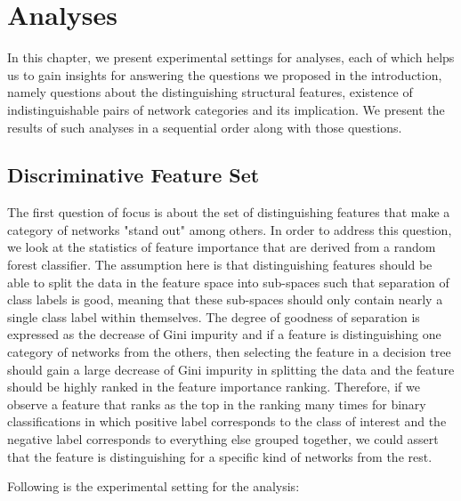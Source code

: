 \chapter{Analyses}
In this chapter, we present experimental settings for analyses, each of which helps us to gain insights for answering the questions we proposed in the introduction, namely questions about the distinguishing structural features, existence of indistinguishable pairs of network categories and its implication. We present the results of such analyses in a sequential order along with those questions. 

\section{Discriminative Feature Set}
The first question of focus is about the set of distinguishing features that make a category of networks "stand out" among others. In order to address this question, we look at the 
 statistics of feature importance that are derived from a random forest classifier. The assumption here is that distinguishing features should be able to split the data in the feature space into sub-spaces such that separation of class labels is good, meaning that these sub-spaces should only contain nearly a single class label within themselves. The degree of goodness of separation is expressed as the decrease of Gini impurity and if a feature is distinguishing one category of networks from the others, then selecting the feature in a decision tree should gain a large decrease of Gini impurity in splitting the data and the feature should be highly ranked in the feature importance ranking. Therefore, if we observe a feature that ranks as the top in the ranking many times for binary classifications in which positive label corresponds to the class of interest and the negative label corresponds to everything else grouped together, we could assert that the feature is distinguishing for a specific kind of networks from the rest. 
 
 Following is the experimental setting for the analysis: 

